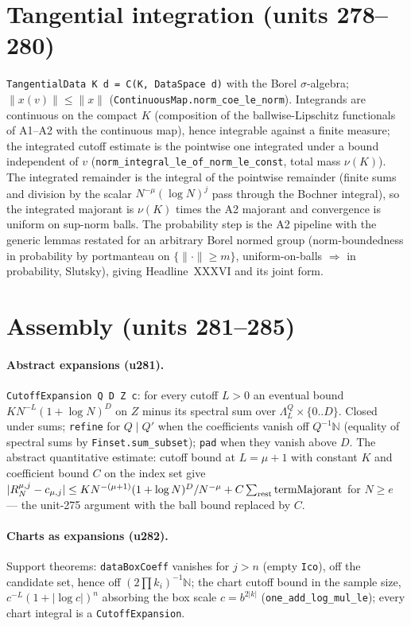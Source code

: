 \documentclass[11pt]{article}
\begin{document}
\section{Tangential integration (units 278--280)}
\texttt{TangentialData K d = C(K, DataSpace d)} with the Borel $\sigma$-algebra; $\|x(v)\|\le\|x\|$
(\texttt{ContinuousMap.norm\_coe\_le\_norm}). Integrands are continuous on the compact $K$ (composition
of the ballwise-Lipschitz functionals of A1--A2 with the continuous map), hence integrable against a
finite measure; the integrated cutoff estimate is the pointwise one integrated under a bound
independent of $v$ (\texttt{norm\_integral\_le\_of\_norm\_le\_const}, total mass $\nu(K)$). The integrated
remainder is the integral of the pointwise remainder (finite sums and division by the scalar
$N^{-\mu}(\log N)^j$ pass through the Bochner integral), so the integrated majorant is
$\nu(K)$ times the A2 majorant and convergence is uniform on sup-norm balls. The probability step is
the A2 pipeline with the generic lemmas restated for an arbitrary Borel normed group (norm-boundedness
in probability by portmanteau on $\{\|\cdot\|\ge m\}$, uniform-on-balls $\Rightarrow$ in probability,
Slutsky), giving Headline~XXXVI and its joint form.

\section{Assembly (units 281--285)}
\paragraph{Abstract expansions (u281).} \texttt{CutoffExpansion Q D Z c}: for every cutoff $L>0$ an
eventual bound $KN^{-L}(1+\log N)^D$ on $Z$ minus its spectral sum over $\Lambda^Q_L\times\{0..D\}$.
Closed under sums; \texttt{refine} for $Q\mid Q'$ when the coefficients vanish off $Q^{-1}\mathbb N$
(equality of spectral sums by \texttt{Finset.sum\_subset}); \texttt{pad} when they vanish above $D$.
The abstract quantitative estimate: cutoff bound at $L=\mu+1$ with constant $K$ and coefficient bound
$C$ on the index set give $|R_N^{\mu,j}-c_{\mu,j}|\le K N^{-(\mu+1)}(1+\log N)^D/N^{-\mu}+C\sum_{\rm rest}
\mathrm{termMajorant}$ for $N\ge e$ --- the unit-275 argument with the ball bound replaced by $C$.
\paragraph{Charts as expansions (u282).} Support theorems: \texttt{dataBoxCoeff} vanishes for $j>n$
(empty \texttt{Ico}), off the candidate set, hence off $(2\prod k_i)^{-1}\mathbb N$; the chart cutoff
bound in the sample size, $c^{-L}(1+|\log c|)^n$ absorbing the box scale $c=b^{2|k|}$
(\texttt{one\_add\_log\_mul\_le}); every chart integral is a \texttt{CutoffExpansion}.
\end{document}
